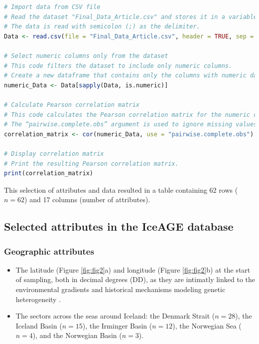 \begin{lstlisting}[label=lst:pearson,language=R,caption=RStudio script to calculate the Pearson correlation coefficient between all the numerical attributes in our final dataset]
# Import data from CSV file
# Read the dataset "Final_Data_Article.csv" and stores it in a variable called Data.
# The data is read with semicolon (;) as the delimiter.
Data <- read.csv(file = "Final_Data_Article.csv", header = TRUE, sep = ";")

# Select numeric columns only from the dataset
# This code filters the dataset to include only numeric columns.
# Create a new dataframe that contains only the columns with numeric data.
numeric_Data <- Data[sapply(Data, is.numeric)]

# Calculate Pearson correlation matrix
# This code calculates the Pearson correlation matrix for the numeric columns.
# The “pairwise.complete.obs” argument is used to ignore missing values.
correlation_matrix <- cor(numeric_Data, use = "pairwise.complete.obs")

# Display correlation matrix
# Print the resulting Pearson correlation matrix.
print(correlation_matrix)
\end{lstlisting}

This selection of attributes and data resulted in a table containing 62 rows ($n=62$) and 17 columns (number of attributes). 

\subsection{Selected attributes in the IceAGE database}

\subsubsection{Geographic attributes} 

\begin{itemize}
\item The latitude (Figure \ref{fig:fig2}a) and longitude (Figure \ref{fig:fig2}b) at the start of sampling, both in decimal degrees (DD), as they are intimatly linked to the environmental gradients and historical mechanisms modeling genetic heterogeneity \citep{gaither2013origins}.
\item The sectors across the seas around Iceland: the Denmark Strait ($n=28$), the Iceland Basin ($n=15$), the Irminger Basin ($n=12$), the Norwegian Sea ($n=4$), and the Norwegian Basin ($n=3$). 
\end{itemize}

